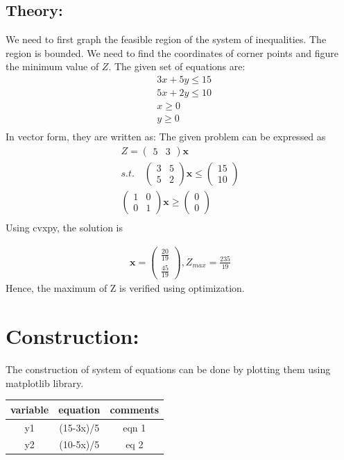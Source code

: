 \documentclass[a4paper,12pt,twocolumn]{article}
\let\vec\mathbf
\newcommand{\myvec}[1]{\ensuremath{\begin{pmatrix}#1\end{pmatrix}}}
\begin{document}
\subsection{Theory:}
We need to first graph the feasible region of the system of inequalities.  The region is bounded. We need to find the coordinates of corner points and figure the minimum value of $Z$. The given set of equations are:
\begin{align}
	&3x+5y\le15\\
	&5x+2y\le10\\
	&x\ge0\\
	&y\ge0\\
\end{align}
In vector form, they are written as:
\fi
The given problem can be expressed as
\begin{align}
	Z =\myvec{5 & 3}\vec{x}
	\\
s.t. \quad	\myvec{3 & 5\\5&2}\vec{x}\le\myvec{15\\10}\\
	\myvec{1&0\\0&1}\vec{x}\ge\myvec{0\\0}\\
\end{align}
Using cvxpy, the 
solution is 

\begin{align}
	\vec{x} = \myvec{\frac{20}{19}\\\frac{45}{19}},
	Z_{max} = \frac{235}{19}
\end{align}
\iffalse
Hence, the maximum of Z is verified using optimization.
 
\section{Construction:}
The construction of system of equations can be done by plotting them using matplotlib library.
\begin{table}[h]
        \centering
\setlength\extrarowheight{2pt}
        \begin{tabular}{|c|c|c|}
                \hline
		\textbf{variable} & \textbf{equation} & \textbf{comments}\\
		\hline
		y1 & (15-3x)/5 & eqn 1\\
		\hline
		y2 & (10-5x)/5 & eq 2\\
		\hline
	\end{tabular}
\end{table}
\end{document}
